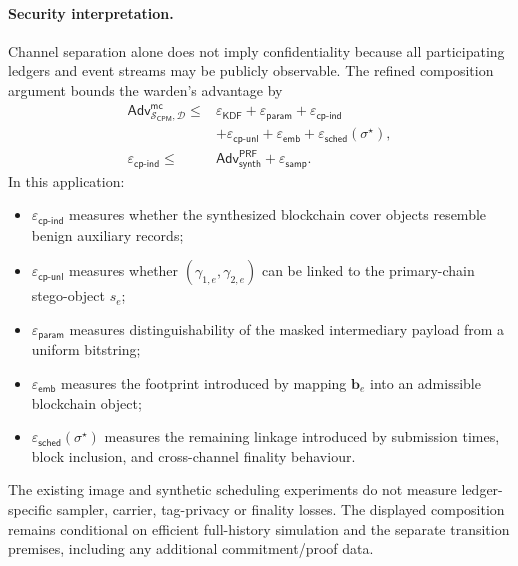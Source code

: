 \documentclass[journal]{IEEEtran}
\theoremstyle{definition}
\theoremstyle{game}
\begin{document}
\paragraph{Security interpretation.}
Channel separation alone does not imply confidentiality because
all participating ledgers and event streams may be publicly
observable. The refined composition argument bounds the warden's
advantage by
\begin{align}\label{eq:blockchain_composition}
\mathsf{Adv}^{\mathsf{mc}}_{\mathcal S_{\mathsf{CPM}},\mathbf{\mathcal D}}
\le{}&\varepsilon_{\mathsf{KDF}}+\varepsilon_{\mathsf{param}}+
\varepsilon_{\mathsf{cp\text{-}ind}}\nonumber\\
&+\varepsilon_{\mathsf{cp\text{-}unl}}+\varepsilon_{\mathsf{emb}}+
\varepsilon_{\mathsf{sched}}(\sigma^\star),\\
\varepsilon_{\mathsf{cp\text{-}ind}}
\le{}&\mathsf{Adv}^{\mathsf{PRF}}_{\mathsf{synth}}+\varepsilon_{\mathsf{samp}}.
\end{align}
In this application:

\begin{itemize}
\item
$\varepsilon_{\mathsf{cp\text{-}ind}}$ measures whether the
synthesized blockchain cover objects resemble benign auxiliary
records;

\item
$\varepsilon_{\mathsf{cp\text{-}unl}}$ measures whether
$(\gamma_{1,e},\gamma_{2,e})$ can be linked to the primary-chain
stego-object $s_e$;

\item
$\varepsilon_{\mathsf{param}}$ measures distinguishability of the
masked intermediary payload from a uniform bitstring;

\item
$\varepsilon_{\mathsf{emb}}$ measures the footprint introduced
by mapping $\mathbf{b}_e$ into an admissible blockchain object;

\item
$\varepsilon_{\mathsf{sched}}(\sigma^\star)$ measures the
remaining linkage introduced by submission times, block inclusion,
and cross-channel finality behaviour.
\end{itemize}

The existing image and synthetic scheduling experiments do not measure
ledger-specific sampler, carrier, tag-privacy or finality losses. The displayed
composition remains conditional on efficient full-history simulation and the
separate transition premises, including any additional commitment/proof data.
\end{document}
